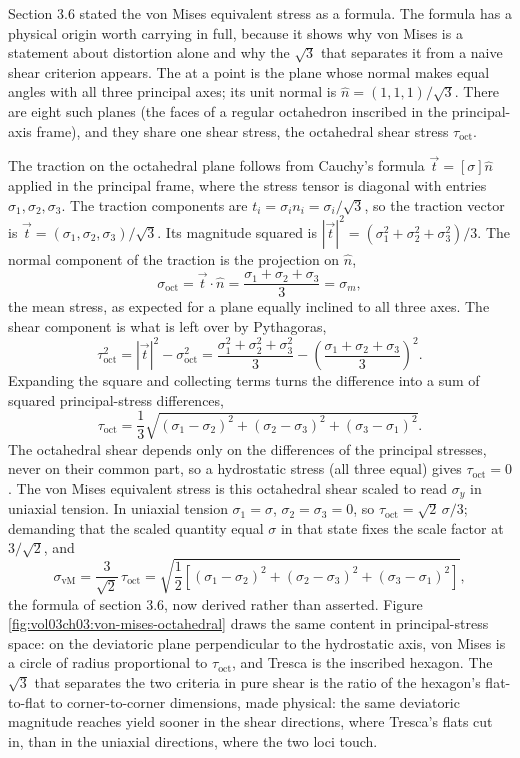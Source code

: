 Section 3.6 stated the von Mises equivalent stress as a formula. The
formula has a physical origin worth carrying in full, because it shows
why von Mises is a statement about distortion alone and why the
$\sqrt{3}$ that separates it from a naive shear criterion appears. The
 at a point is the plane whose normal makes
equal angles with all three principal axes; its unit normal is $\hat{n}
= (1, 1, 1)/\sqrt{3}$. There are eight such planes (the faces of a
regular octahedron inscribed in the principal-axis frame), and they
share one shear stress, the octahedral shear stress $\tau_{\text{oct}}$.

The traction on the octahedral plane follows from Cauchy's formula
$\vec{t} = [\sigma]\hat{n}$ applied in the principal frame, where the
stress tensor is diagonal with entries $\sigma_1, \sigma_2, \sigma_3$.
The traction components are $t_i = \sigma_i n_i = \sigma_i/\sqrt{3}$, so
the traction vector is $\vec{t} = (\sigma_1, \sigma_2, \sigma_3)/\sqrt{3}$.
Its magnitude squared is $|\vec{t}|^2 = (\sigma_1^2 + \sigma_2^2 +
\sigma_3^2)/3$. The normal component of the traction is the projection on
$\hat{n}$,
\[
\sigma_{\text{oct}} = \vec{t}\cdot\hat{n} = \frac{\sigma_1 + \sigma_2 +
\sigma_3}{3} = \sigma_m,
\]
the mean stress, as expected for a plane equally inclined to all three
axes. The shear component is what is left over by Pythagoras,
\[
\tau_{\text{oct}}^2 = |\vec{t}|^2 - \sigma_{\text{oct}}^2 =
\frac{\sigma_1^2 + \sigma_2^2 + \sigma_3^2}{3} - \left(\frac{\sigma_1 +
\sigma_2 + \sigma_3}{3}\right)^2.
\]
Expanding the square and collecting terms turns the difference into a
sum of squared principal-stress differences,
\[
\tau_{\text{oct}} = \frac{1}{3}\sqrt{(\sigma_1 - \sigma_2)^2 +
(\sigma_2 - \sigma_3)^2 + (\sigma_3 - \sigma_1)^2}.
\]
The octahedral shear depends only on the differences of the principal
stresses, never on their common part, so a hydrostatic stress (all three
equal) gives $\tau_{\text{oct}} = 0$. The von Mises equivalent stress is
this octahedral shear scaled to read $\sigma_y$ in uniaxial tension. In
uniaxial tension $\sigma_1 = \sigma$, $\sigma_2 = \sigma_3 = 0$, so
$\tau_{\text{oct}} = \sqrt{2}\,\sigma/3$; demanding that the scaled
quantity equal $\sigma$ in that state fixes the scale factor at
$3/\sqrt{2}$, and
\[
\sigma_{\text{vM}} = \frac{3}{\sqrt{2}}\,\tau_{\text{oct}} =
\sqrt{\frac{1}{2}\left[(\sigma_1 - \sigma_2)^2 + (\sigma_2 - \sigma_3)^2
+ (\sigma_3 - \sigma_1)^2\right]},
\]
the formula of section 3.6, now derived rather than asserted. Figure
\ref{fig:vol03ch03:von-mises-octahedral} draws the same content in
principal-stress space: on the deviatoric plane perpendicular to the
hydrostatic axis, von Mises is a circle of radius proportional to
$\tau_{\text{oct}}$, and Tresca is the inscribed hexagon. The $\sqrt{3}$
that separates the two criteria in pure shear is the ratio of the
hexagon's flat-to-flat to corner-to-corner dimensions, made physical:
the same deviatoric magnitude reaches yield sooner in the shear
directions, where Tresca's flats cut in, than in the uniaxial
directions, where the two loci touch.

